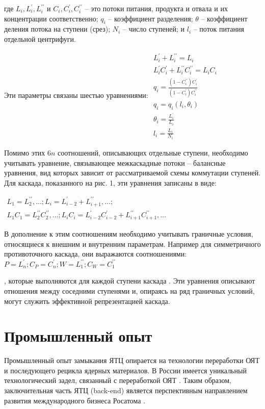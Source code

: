 где $L_{i}, L_{i}^{\prime}, L_{i}^{\prime \prime}$ и $C_{i}, C_{i}^{\prime}, C_{i}^{\prime \prime}$ -- 
это потоки питания, продукта и отвала и их концентрации соответственно; $q_{i}$ -- коэффициент разделения; $\theta$ -- коэффициент деления потока на ступени (срез); $N_{i}$ -- число ступеней; и $l_{i}$ -- поток питания отдельной центрифуги.

Эти параметры связаны шестью уравнениями:
$\begin{array}{c}
  {L_{i}^{\prime}+L_{i}^{\prime \prime}=L_{i}} \\
  {L_{i}^{\prime} C_{i}^{\prime}+L_{i}^{\prime \prime} C_{i}^{\prime \prime}=L_{i} C_{i}} \\
  {q_{i}=\frac{(1-C_{i}^{\prime \prime}) C_{i}^{\prime}}{(1-C_{i}^{\prime}) C_{i}^{\prime \prime}}} \\
  {q_{i}=q_{i}\left(l_{i}, \theta_{i}\right)} \\
  {\theta_{i}=\frac{L_{i}^{\prime}}{L_{i}}} \\
  {l_{i}=\frac{L_{i}}{N_{i}}}
\end{array}$


Помимо этих 6$n$ соотношений, описывающих отдельные ступени, необходимо учитывать уравнение, связывающее межкаскадные потоки -- балансные уравнения, вид которых зависит от рассматриваемой схемы коммутации ступеней. Для каскада, показанного на рис. 1, эти уравнения записаны в виде:

$\begin{array}{c}
  {L_{1}=L_{2}^{\prime \prime}, \ldots ; L_{i}=L_{i-2}^{\prime}+L_{i+1}^{\prime \prime}, \ldots ;} \\
  {L_{1} C_{1}=L_{2}^{\prime \prime} C_{2}^{\prime \prime}, \ldots ; L_{i} C_{i}=L_{i-2}^{\prime} C_{i-2}^{\prime}+L_{i+1}^{\prime \prime} C_{i+1}^{\prime \prime}, \ldots}
\end{array}$

В дополнение к этим соотношениям необходимо учитывать граничные условия, относящиеся к внешним и внутренним параметрам. Например для симметричного противоточного каскада, они выражаются соотношениями: 
$P=L_{n}^{\prime} ; C_{P}=C_{n}^{\prime} ; W=L_{1}^{\prime \prime} ; C_{W}=C_{1}^{\prime \prime}$

, которые выполняются для каждой ступени каскада \cite{palkinDeterminationOptimalParameters2012}. Эти уравнения описывают отношения между соседними ступенями и, опираясь на ряд граничных условий, могут служить эффективной репрезентацией каскада.

\section{Промышленный опыт}\label{sec:ch1/sec1}
Промышленный опыт замыкания ЯТЦ опирается на технологии переработки ОЯТ и последующего рецикла ядерных материалов. В России имеется уникальный технологический задел, связанный с переработкой ОЯТ \cite{balihinSostoyaniiPerspektivahRazvitiya2018}. Таким образом, заключительная часть ЯТЦ (back-end) является перспективным направлением развития международного бизнеса Росатома \cite{efimenkoProblemyPerspektivyRazvitiya2017}. 

